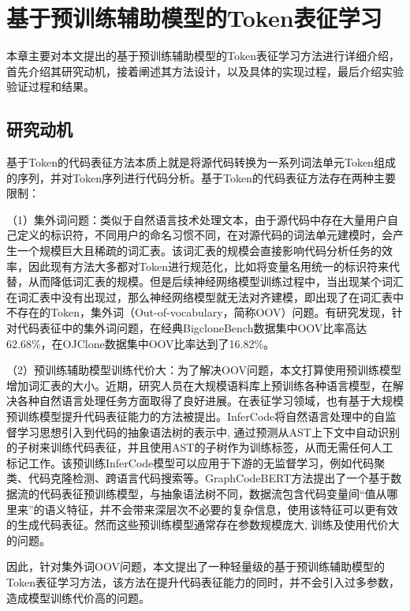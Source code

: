 \chapter{基于预训练辅助模型的Token表征学习}
\label{chap:Token}
本章主要对本文提出的基于预训练辅助模型的Token表征学习方法进行详细介绍，首先介绍其研究动机，接着阐述其方法设计，以及具体的实现过程，最后介绍实验验证过程和结果。

\section{研究动机}
\label{sec:TokenMotivation}

基于Token的代码表征方法本质上就是将源代码转换为一系列词法单元Token组成的序列，并对Token序列进行代码分析。基于Token的代码表征方法存在两种主要限制：

（1）集外词问题：类似于自然语言技术处理文本，由于源代码中存在大量用户自己定义的标识符，不同用户的命名习惯不同，在对源代码的词法单元建模时，会产生一个规模巨大且稀疏的词汇表。该词汇表的规模会直接影响代码分析任务的效率，因此现有方法大多都对Token进行规范化，比如将变量名用统一的标识符来代替，从而降低词汇表的规模。但是后续神经网络模型训练过程中，当出现某个词汇在词汇表中没有出现过，那么神经网络模型就无法对齐建模，即出现了在词汇表中不存在的Token，集外词（Out-of-vocabulary，简称OOV）问题。有研究\cite{RJXB202205011}发现，针对代码表征中的集外词问题，在经典BigcloneBench\cite{7332459}数据集中OOV比率高达62.68\%，在OJClone数据集\cite{WOS:000485474201046}中OOV比率达到了16.82\%。

（2）预训练辅助模型训练代价大：为了解决OOV问题，本文打算使用预训练模型增加词汇表的大小。近期，研究人员在大规模语料库上预训练各种语言模型，在解决各种自然语言处理任务方面取得了良好进展\cite{zhao2023survey}。在表征学习领域，也有基于大规模预训练模型提升代码表征能力的方法被提出。InferCode\cite{9402028}将自然语言处理中的自监督学习思想引入到代码的抽象语法树的表示中, 通过预测从AST上下文中自动识别的子树来训练代码表征，并且使用AST的子树作为训练标签，从而无需任何人工标记工作。该预训练InferCode模型可以应用于下游的无监督学习，例如代码聚类、代码克隆检测、跨语言代码搜索等。GraphCodeBERT\cite{guo2021graphcodebert}方法提出了一个基于数据流的代码表征预训练模型，与抽象语法树不同，数据流包含代码变量间“值从哪里来”的语义特征，并不会带来深层次不必要的复杂信息，使用该特征可以更有效的生成代码表征。然而这些预训练模型通常存在参数规模庞大, 训练及使用代价大的问题。

因此，针对集外词OOV问题，本文提出了一种轻量级的基于预训练辅助模型的Token表征学习方法，该方法在提升代码表征能力的同时，并不会引入过多参数，造成模型训练代价高的问题。

